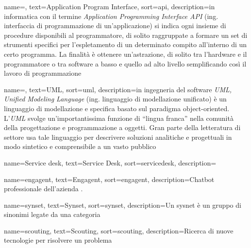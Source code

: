 
\renewcommand{\acronymname}{Acronimi e abbreviazioni}




{
    name=,
    text=Application Program Interface,
    sort=api,
    description={in informatica con il termine \emph{Application Programming Interface API} (ing. interfaccia di programmazione di un'applicazione) si indica ogni insieme di procedure disponibili al programmatore, di solito raggruppate a formare un set di strumenti specifici per l'espletamento di un determinato compito all'interno di un certo programma. La finalità è ottenere un'astrazione, di solito tra l'hardware e il programmatore o tra software a basso e quello ad alto livello semplificando così il lavoro di programmazione}
}

{
    name=,
    text=UML,
    sort=uml,
    description={in ingegneria del software \emph{UML, Unified Modeling Language} (ing. linguaggio di modellazione unificato) è un linguaggio di modellazione e specifica basato sul paradigma object-oriented. L'\emph{UML} svolge un'importantissima funzione di ``lingua franca'' nella comunità della progettazione e programmazione a oggetti. Gran parte della letteratura di settore usa tale linguaggio per descrivere soluzioni analitiche e progettuali in modo sintetico e comprensibile a un vasto pubblico}
}


{
    name=Service desk,
    text=Service Desk,
    sort=servicedesk,
    description={}
}

{
    name=engagent,
    text=Engagent,
    sort=engagent,
    description={Chatbot professionale dell'azienda \company{}.}
}

{
    name=synset,
    text=Synset,
    sort=synset,
    description={Un sysnet è un gruppo di sinonimi legate da una categoria}
}

{
    name=scouting,
    text=Scouting,
    sort=scouting,
    description={Ricerca di nuove tecnologie per risolvere un problema}
}

